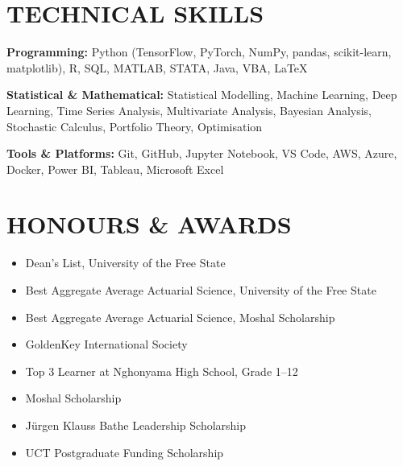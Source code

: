 \documentclass[letterpaper,11pt]{article}
\newcommand{\resumeItem}[1]{
  \item\small{
    {#1 \vspace{-1pt}}
  }
}
\newcommand{\resumeItemListStart}{\begin{itemize}[leftmargin=0.1in]}
\newcommand{\resumeItemListEnd}{\end{itemize}\vspace{-5pt}}
\begin{document}
\section{\color{airforceblue}TECHNICAL SKILLS}
 \begin{itemize}[leftmargin=0in, label={}]
    \small{\item{
     \textbf{\normalsize{Programming:}}{ \normalsize{Python (TensorFlow, PyTorch, NumPy, pandas, scikit-learn, matplotlib), R, SQL, MATLAB, STATA, Java, VBA, LaTeX}} \\
      \vspace{1.2pt}

     \textbf{\normalsize{Statistical \& Mathematical:}}{ \normalsize{Statistical Modelling, Machine Learning, Deep Learning, Time Series Analysis, Multivariate Analysis, Bayesian Analysis, Stochastic Calculus, Portfolio Theory, Optimisation}} \\
      \vspace{1.2pt}

     \textbf{\normalsize{Tools \& Platforms:}}{ \normalsize{Git, GitHub, Jupyter Notebook, VS Code, AWS, Azure, Docker, Power BI, Tableau, Microsoft Excel}}

     }}
 \end{itemize}
 \vspace{-2pt}

\section{\color{airforceblue}HONOURS \& AWARDS}

  \resumeItemListStart
    \resumeItem{\normalsize{Dean's List, University of the Free State}}
    \vspace{-3pt}
    \resumeItem{\normalsize{Best Aggregate Average Actuarial Science, University of the Free State}}
    \vspace{-3pt}
    \resumeItem{\normalsize{Best Aggregate Average Actuarial Science, Moshal Scholarship}}
    \vspace{-3pt}
    \resumeItem{\normalsize{GoldenKey International Society}}
    \vspace{-3pt}
    \resumeItem{\normalsize{Top 3 Learner at Nghonyama High School, Grade 1--12}}
    \vspace{-3pt}
    \resumeItem{\normalsize{Moshal Scholarship}}
    \vspace{-3pt}
    \resumeItem{\normalsize{J\"urgen Klauss Bathe Leadership Scholarship}}
    \vspace{-3pt}
    \resumeItem{\normalsize{UCT Postgraduate Funding Scholarship}}
  \resumeItemListEnd
\end{document}
